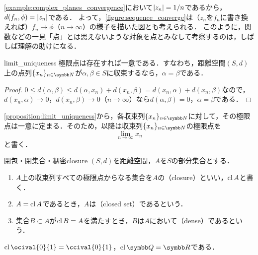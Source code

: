 \documentclass[../../main]{subfiles}
\begin{document}
\begin{note}
  \cref{example:complex_planes_convergence}において\(\lvert z_n\rvert=1/n\)であるから，\(d(f_n,\phi)=\lvert z_n\rvert\)である．
  よって，\cref{figure:sequence_converge}は（\(z_n\)を\(f_n\)に書き換えれば）\(f_n\to\phi\)（\(n\to\infty\)）の様子を描いた図とも考えられる．
  このように，関数などの一見「点」とは思えないような対象を点とみなして考察するのは，しばしば理解の助けになる．
\end{note}

\begin{proposition}{}{limit_uniqueness}
  極限点は存在すれば一意である．すなわち，距離空間\((S,d)\)上の点列\(\seq{x_n}_{n\in\numset{N}}\)が\(\alpha,\beta\in S\)に収束するなら，\(\alpha=\beta\)である．
\end{proposition}

\begin{proof}
  \(0\leq d(\alpha,\beta)\leq d(\alpha,x_n)+d(x_n,\beta)=d(x_n,\alpha)+d(x_n,\beta)\)なので，\(d(x_n,\alpha)\to 0\)，\(d(x_n,\beta)\to 0\)（\(n\to\infty\)）なら\(d(\alpha,\beta)=0\)，\(\alpha=\beta\)である．
\end{proof}

\cref{proposition:limit_uniqueness}から，各収束列\(\seq{x_n}_{n\in\numset{N}}\)に対して，その極限点は一意に定まる．そのため，以降は収束列\(\seq{x_n}_{n\in\numset{N}}\)の極限点を
\[
  \lim_{n\to\infty}x_n
\]
と書く．

\begin{definition}{閉包・閉集合・稠密}{closure}
  \((S,d)\)を距離空間，\(A\)を\(S\)の部分集合とする．
  \begin{enumerate}
    \item \(A\)上の収束列すべての極限点からなる集合を\(A\)の（closure）といい，\(\operatorname{cl} A\)と書く\footnotemark ．
    \item \(A=\operatorname{cl} A\)であるとき，\(A\)は（closed set）であるという．
    \item 集合\(B\subset A\)が\(\operatorname{cl} B=A\)を満たすとき，\(B\)は\(A\)において（dense）であるという．
  \end{enumerate}
\end{definition}


\begin{example}
  \(\clsr\ocival{0}{1}=\ccival{0}{1}\)，\(\clsr\numset{Q}=\numset{R}\)である．
\end{example}
\end{document}

